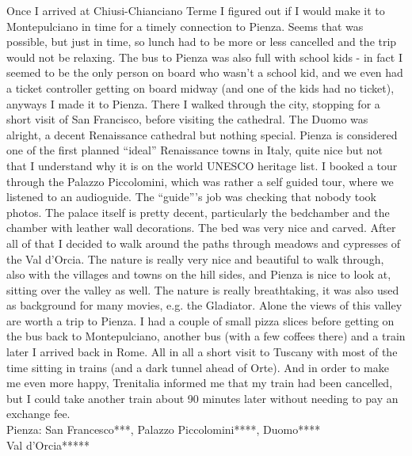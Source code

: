 Once I arrived at Chiusi-Chianciano Terme I figured out if I would make it to Montepulciano in time for a timely connection to Pienza. Seems that was possible, but just in time, so lunch had to be more or less cancelled and the trip would not be relaxing. The bus to Pienza was also full with school kids - in fact I seemed to be the only person on board who wasn't a school kid, and we even had a ticket controller getting on board midway (and one of the kids had no ticket), anyways I made it to Pienza. There I walked through the city, stopping for a short visit of San Francisco, before visiting the cathedral. The Duomo was alright, a decent Renaissance cathedral but nothing special. Pienza is considered one of the first planned ``ideal'' Renaissance towns in Italy, quite nice but not that I understand why it is on the world UNESCO heritage list. I booked a tour through the Palazzo Piccolomini, which was rather a self guided tour, where we listened to an audioguide. The ``guide'''s job was checking that nobody took photos. The palace itself is pretty decent, particularly the bedchamber and the chamber with leather wall decorations. The bed was very nice and carved. After all of that I decided to walk around the paths through meadows and cypresses of the Val d'Orcia. The nature is really very nice and beautiful to walk through, also with the villages and towns on the hill sides, and Pienza is nice to look at, sitting over the valley as well. The nature is really breathtaking, it was also used as background for many movies, e.g. the Gladiator. Alone the views of this valley are worth a trip to Pienza. I had a couple of small pizza slices before getting on the bus back to Montepulciano, another bus (with a few coffees there) and a train later I arrived back in Rome. All in all a short visit to Tuscany with most of the time sitting in trains (and a dark tunnel ahead of Orte). And in order to make me even more happy, Trenitalia informed me that my train had been cancelled, but I could take another train about 90 minutes later without needing to pay an exchange fee.\\

Pienza: San Francesco***, Palazzo Piccolomini****, Duomo****\\
Val d'Orcia*****\\

